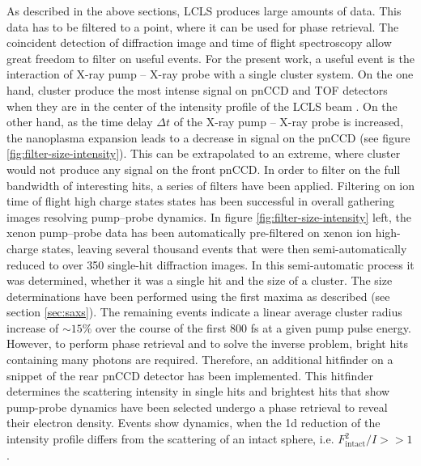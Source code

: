 As described in the above sections, LCLS produces large amounts of data. This data has to be filtered to a point, where it can be used for phase retrieval. The coincident detection of diffraction image and time of flight spectroscopy allow great freedom to filter on useful events. For the present work, a useful event is the interaction of X-ray pump -- X-ray probe with a single cluster system. On the one hand, cluster produce the most intense signal on pnCCD and TOF detectors when they are in the center of the intensity profile of the LCLS beam \citep{Gorkhover-2012-PRL}. On the other hand, as the time delay $\Delta t$ of the X-ray pump -- X-ray probe is increased, the nanoplasma expansion leads to a decrease in signal on the pnCCD (see figure \ref{fig:filter-size-intensity}). This can be extrapolated to an extreme, where cluster would not produce any signal on the front pnCCD. In order to filter on the full bandwidth of interesting hits, a series of filters have been applied. Filtering on ion time of flight high charge states states has been successful in overall gathering images resolving pump--probe dynamics. In figure \ref{fig:filter-size-intensity} left, the xenon pump--probe data has been automatically pre-filtered on xenon ion high-charge states, leaving several thousand events that were then semi-automatically reduced to over 350 single-hit diffraction images. In this semi-automatic process it was determined, whether it was a single hit and the size of a cluster. The size determinations have been performed using the first maxima as described (see section \ref{sec:saxs}). The remaining events indicate a linear average cluster radius increase of $\sim15\%$ over the course of the first 800 fs at a given pump pulse energy. However, to perform phase retrieval and to solve the inverse problem, bright hits containing many photons are required. Therefore, an additional hitfinder on a snippet of the rear pnCCD detector has been implemented. This hitfinder determines the scattering intensity in single hits and brightest hits that show pump-probe dynamics have been selected undergo a phase retrieval to reveal their electron density. Events show dynamics, when the 1d reduction of the intensity profile differs from the scattering of an intact sphere, i.e. $F_{\text{intact}}^{2}/I >> 1$.
%
%
%